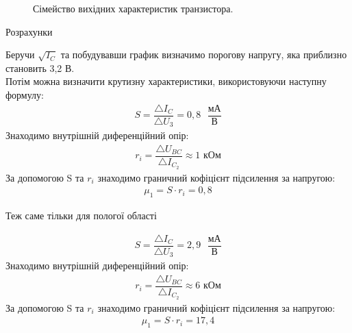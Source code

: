 \documentclass[a4paper,14pt]{extreport}
\begin{document}
\begin{figure}[h!]
\caption{Сімейство вихідних характеристик транзистора.}
\label{ris3}
\end{figure}





\newpage
\clearpage

\begin{center}Розрахунки\\ \end{center}

Беручи $\sqrt{I_C}$  та побудувавши график визначимо порогову напругу, яка приблизно становить 3,2 В.\\
Потім можна визначити крутизну характеристики, використовуючи наступну формулу:
\begin{align}\label{q1}
  S = \dfrac{\triangle I_C}{\triangle U_{\text{3}}} = 0,8 \text{ }\dfrac{\text{мА}}{\text{В}}
\end{align}
Знаходимо внутрішній диференційний опір:
\begin{align}\label{q2}
  r_i = \dfrac{\triangle U_{BC}}{\triangle I_{C_2}} \approx 1 \text{ кОм}
\end{align}
За допомогою S та $r_i$ знаходимо граничний кофіцієнт підсилення за напругою:
\begin{align}\label{q3}
  \mu_1 = S\cdot r_i = 0,8
\end{align}

Теж саме тільки для пологої області

\begin{align}\label{q4}
  S = \dfrac{\triangle I_C}{\triangle U_{\text{3}}} = 2,9 \text{ } \dfrac{\text{мА}}{\text{В}}
\end{align}
Знаходимо внутрішній диференційний опір:
\begin{align}\label{q5}
  r_i = \dfrac{\triangle U_{BC}}{\triangle I_{C_2}} \approx 6 \text{ кОм}
\end{align}
За допомогою S та $r_i$ знаходимо граничний кофіцієнт підсилення за напругою:
\FPeval{}
\begin{align}\label{q6}
  \mu_1 = S\cdot r_i = 17,4
\end{align}
\end{document}
